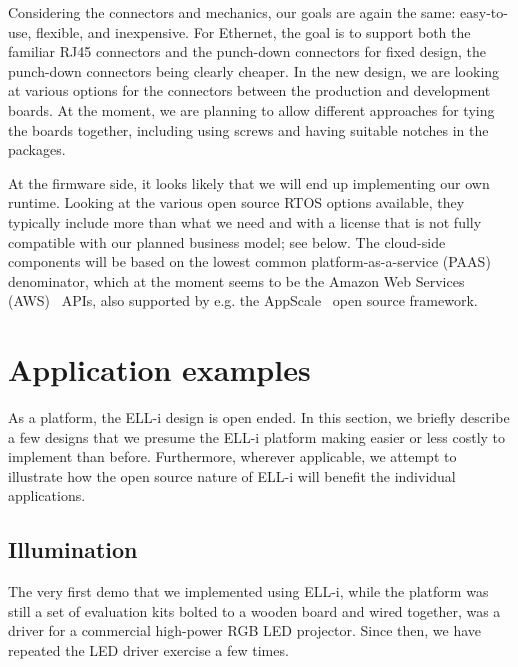 \documentclass[draft,a4paper]{siamltex}
\begin{document}
Considering the connectors and mechanics, our goals are again the
same: easy-to-use, flexible, and inexpensive.  For Ethernet, the goal
is to support both the familiar RJ45 connectors and the punch-down
connectors for fixed design, the punch-down connectors being clearly
cheaper.  In the new design, we are looking at various options for the
connectors between the production and development boards.  At the
moment, we are planning to allow different approaches for tying the
boards together, including using screws and having suitable notches in
the packages.

At the firmware side, it looks likely that we will end up implementing
our own runtime.  Looking at the various open source RTOS options
available, they typically include more than what we need and with a
license that is not fully compatible with our planned business model;
see below.  The cloud-side components will be based on the lowest
common platform-as-a-service (PAAS) denominator, which at the moment
seems to be the Amazon Web Services (AWS)~\cite{AWS} APIs, also supported by
e.g. the AppScale~\cite{AppScale} open source framework.


\section{Application examples}
\label{sec:examples}

As a platform, the ELL-i design is open ended.  In this section, we
briefly describe a few designs that we presume the ELL-i platform
making easier or less costly to implement than before.  Furthermore,
wherever applicable, we attempt to illustrate how the open source
nature of ELL-i will benefit the individual applications.

\subsection{Illumination}

The very first demo that we implemented using ELL-i, while the
platform was still a set of evaluation kits bolted to a wooden board
and wired together, was a driver for a commercial high-power RGB LED
projector.  Since then, we have repeated the LED driver exercise a few
times.
\end{document}
